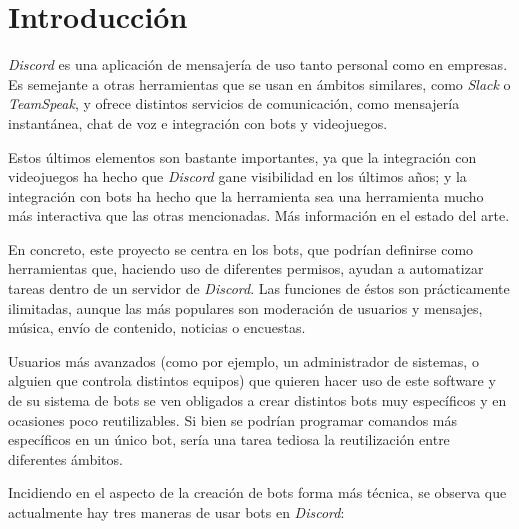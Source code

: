 \chapter{Introducción}

\textit{Discord}\cite{discord} es una aplicación de mensajería de uso tanto personal como en empresas. Es semejante a otras herramientas que se usan en ámbitos similares, como \textit{Slack}\cite{slack} o \textit{TeamSpeak}\cite{teamspeak}, y ofrece distintos servicios de comunicación, como mensajería instantánea, chat de voz e integración con bots y videojuegos.

Estos últimos elementos son bastante importantes, ya que la integración con videojuegos ha hecho que \textit{Discord} gane visibilidad en los últimos años; y la integración con bots ha hecho que la herramienta sea una herramienta mucho más interactiva que las otras mencionadas. Más información en el estado del arte.

En concreto, este proyecto se centra en los bots, que podrían definirse como herramientas que, haciendo uso de diferentes permisos, ayudan a automatizar tareas dentro de un servidor de \textit{Discord}. Las funciones de éstos son prácticamente ilimitadas, aunque las más populares son moderación de usuarios y mensajes, música, envío de contenido, noticias o encuestas.

Usuarios más avanzados (como por ejemplo, un administrador de sistemas, o alguien que controla distintos equipos) que quieren hacer uso de este software y de su sistema de bots se ven obligados a crear distintos bots muy específicos y en ocasiones poco reutilizables. Si bien se podrían programar comandos más específicos en un único bot, sería una tarea tediosa la reutilización entre diferentes ámbitos.

Incidiendo en el aspecto de la creación de bots forma más técnica, se observa que actualmente hay tres maneras de usar bots en \textit{Discord}:

